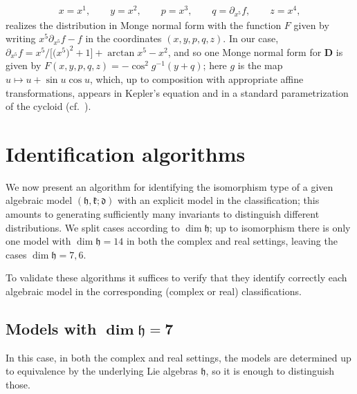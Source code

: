 \documentclass[10pt,a4paper]{amsart}
\newcommand{\mbD}{\mathbf{D}}
\newcommand{\mfd} {\mathfrak{d}}
\newcommand{\mfh} {\mathfrak{h}}
\newcommand{\mfk} {\mathfrak{k}}
\numberwithin{equation}{section}
\begin{document}
\begin{Example}
\begin{gather*}
	x = x^1, \qquad
	y = x^2, \qquad
	p = x^3, \qquad
	q = \partial_{x^5} f, \qquad
	z = x^4 ,
\end{gather*}
realizes  the distribution in Monge normal form with the function $F$ given by writing $x^5 \partial_{x^5} f - f$ in the coordinates $(x, y, p, q, z)$. In our case, $\partial_{x^5} f = x^5 / \big[\big(x^5\big)^2 + 1\big] + \arctan x^5 - x^2$, and so one Monge normal form for $\mbD$ is given by $F(x, y, p, q, z) = -\cos^2 g^{-1}(y + q)$; here $g$ is the map $u \mapsto u + \sin u \cos u$, which, up to composition with appropriate affine transformations, appears in Kepler's equation and in a standard parametrization of the cycloid (cf.\ \cite[Section~4]{CartanFiveVariables}).
\end{Example}


\section{Identification algorithms}\label{section:identification}
We now present an algorithm for identifying the isomorphism type of a given algebraic model $(\mfh, \mfk; \mfd)$ with an explicit model in the classification; this amounts to generating sufficiently many invariants to distinguish different distributions. We split cases according to $\dim \mfh$; up to isomorphism there is only one model with $\dim \mfh = 14$ in both the complex and real settings, leaving the cases $\dim \mfh = 7, 6$.

To validate these algorithms it suffices to verify that they identify correctly each algebraic model in the corresponding (complex or real) classifications.

\subsection[Models with $\dim \mfh = 7$]{Models with $\boldsymbol{\dim \mfh = 7}$}

In this case, in both the complex and real settings, the models are determined up to equivalence by the underlying Lie algebras $\mfh$, so it is enough to distinguish those.
\end{document}
